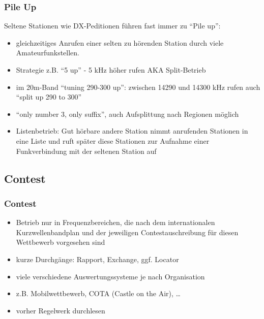 \begin{frame}
    \frametitle{Pile Up}


    Seltene Stationen wie DX-Peditionen führen fast
    immer zu ``Pile up'':

    \begin{itemize}
        \item gleichzeitiges Anrufen einer selten zu hörenden Station durch viele
              Amateurfunkstellen.
        \item Strategie z.B. ``5 up'' - 5 kHz höher rufen AKA Split-Betrieb
        \item im 20m-Band ``tuning 290-300 up'': zwischen 14290 und 14300 kHz rufen
              auch ``split up 290 to 300''
        \item ``only number 3, only suffix'', auch Aufsplittung nach Regionen möglich
        \item Listenbetrieb: Gut hörbare andere Station nimmt anrufenden
        Stationen in eine Liste und ruft später diese Stationen zur Aufnahme
        einer Funkverbindung mit der seltenen Station auf
    \end{itemize}
\end{frame}

\subsection{Contest}

\begin{frame}
    \frametitle{Contest}


    \begin{itemize}
        \item Betrieb nur in Frequenzbereichen, die nach dem internationalen
          Kurzwellenbandplan und der jeweiligen Contestauschreibung für diesen
          Wettbewerb vorgesehen sind
        \item kurze Durchgänge: Rapport, Exchange, ggf. Locator
        \item viele verschiedene Auswertungssysteme je nach Organisation
        \item z.B. Mobilwettbewerb, COTA (Castle on the Air), \dots
        \item vorher Regelwerk durchlesen
    \end{itemize}

\end{frame}


